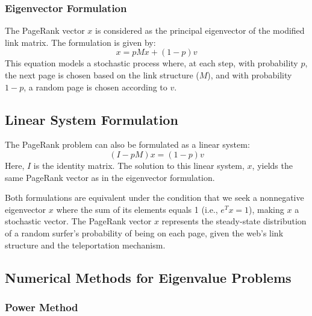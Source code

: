 \documentclass[unicode,11pt,a4paper,oneside,numbers=endperiod,openany]{scrartcl}
\begin{document}
\subsubsection*{Eigenvector Formulation}
The PageRank vector $x$ is considered as the principal eigenvector of the modified link matrix. The formulation is given by:
\begin{equation}
    x = pMx + (1 - p)v
\end{equation}
This equation models a stochastic process where, at each step, with probability $p$, the next page is chosen based on the link structure ($M$), and with probability $1 - p$, a random page is chosen according to $v$.

\subsection*{Linear System Formulation}
The PageRank problem can also be formulated as a linear system:
\begin{equation}
    (I - pM)x = (1 - p)v
\end{equation}
Here, $I$ is the identity matrix. The solution to this linear system, $x$, yields the same PageRank vector as in the eigenvector formulation.

Both formulations are equivalent under the condition that we seek a nonnegative eigenvector $x$ where the sum of its elements equals 1 (i.e., $e^Tx = 1$), making $x$ a stochastic vector. The PageRank vector $x$ represents the steady-state distribution of a random surfer's probability of being on each page, given the web's link structure and the teleportation mechanism.




\subsection{Numerical Methods for Eigenvalue Problems}

\subsubsection{Power Method}
\end{document}
